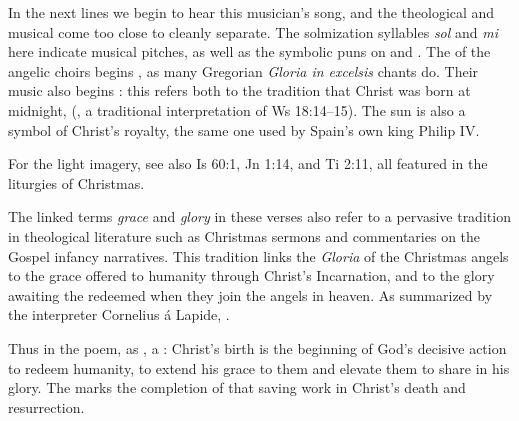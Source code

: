 In the next lines we begin to hear this musician's song, and the theological and
musical come too close to cleanly separate.
The solmization syllables \emph{sol} and \emph{mi} here indicate musical
pitches, as well as the symbolic puns on  and .
The  of the angelic choirs begins , as many
Gregorian \emph{Gloria in excelsis} chants do. 
Their music also begins : this refers both to the tradition
that Christ was born at midnight, 
(, a traditional interpretation of Ws 18:14--15).%
    \Autocite
    [37: .]
    {LuisdeGranada:Xmas}
The sun is also a symbol of Christ's royalty, the same one used by Spain's own
king Philip IV.%
\begin{Footnote}
    For the light imagery, see also Is 60:1, Jn 1:14, and Ti 2:11, all featured
    in the liturgies of Christmas.
\end{Footnote}

The linked terms \emph{grace} and \emph{glory} in these verses also refer to
a pervasive tradition in theological literature such as Christmas sermons and
commentaries on the Gospel infancy narratives.
This tradition links the \emph{Gloria} of the Christmas angels to the grace
offered to humanity through Christ's Incarnation, and to the glory awaiting the
redeemed when they join the angels in heaven.
As summarized by the interpreter Cornelius á Lapide, .%
    \Autocites
    [878, on Jn 1:4:
    .]
    {Lapide:Gospels19C}
    [Cf.] [98, Sermo 185, In Natali Domini 2, in connection with Rom 5:1--2]
    {Augustine:SermonesPL}

Thus in the poem, as , a : Christ's
birth is the beginning of God's decisive action to redeem humanity, to extend
his grace to them and elevate them to share in his glory.
The  marks the completion of that saving work in Christ's
death and resurrection.

